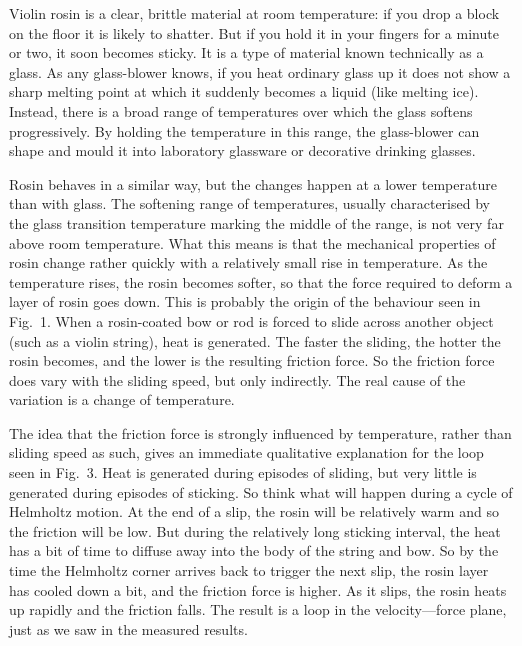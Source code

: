   Violin rosin is a clear, brittle material at room temperature: if you drop a 
  block on the floor it is likely to shatter. But if you hold it in your 
  fingers for a minute or two, it soon becomes sticky. It is a type of material 
  known technically as a glass. As any glass-blower knows, if you heat ordinary 
  glass up it does not show a sharp melting point at which it suddenly becomes 
  a liquid (like melting ice). Instead, there is a broad range of temperatures 
  over which the glass softens progressively. By holding the temperature in 
  this range, the glass-blower can shape and mould it into laboratory glassware 
  or decorative drinking glasses. 

  Rosin behaves in a similar way, but the changes happen at a lower temperature 
  than with glass. The softening range of temperatures, usually characterised 
  by the glass transition temperature marking the middle of the range, is not 
  very far above room temperature. What this means is that the mechanical 
  properties of rosin change rather quickly with a relatively small rise in 
  temperature. As the temperature rises, the rosin becomes softer, so that the 
  force required to deform a layer of rosin goes down. This is probably the 
  origin of the behaviour seen in Fig.\ 1. When a rosin-coated bow or rod is 
  forced to slide across another object (such as a violin string), heat is 
  generated. The faster the sliding, the hotter the rosin becomes, and the 
  lower is the resulting friction force. So the friction force does vary with 
  the sliding speed, but only indirectly. The real cause of the variation is a 
  change of temperature. 

  The idea that the friction force is strongly influenced by temperature, 
  rather than sliding speed as such, gives an immediate qualitative explanation 
  for the loop seen in Fig.\ 3. Heat is generated during episodes of sliding, 
  but very little is generated during episodes of sticking. So think what will 
  happen during a cycle of Helmholtz motion. At the end of a slip, the rosin 
  will be relatively warm and so the friction will be low. But during the 
  relatively long sticking interval, the heat has a bit of time to diffuse away 
  into the body of the string and bow. So by the time the Helmholtz corner 
  arrives back to trigger the next slip, the rosin layer has cooled down a bit, 
  and the friction force is higher. As it slips, the rosin heats up rapidly and 
  the friction falls. The result is a loop in the velocity—force plane, just as 
  we saw in the measured results. 

